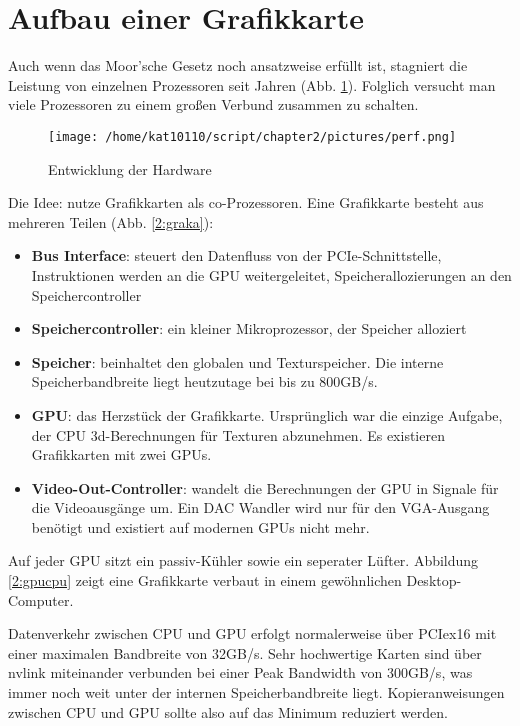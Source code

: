         \section{Aufbau einer Grafikkarte}
        Auch wenn das Moor'sche Gesetz noch ansatzweise erfüllt ist, stagniert die Leistung von einzelnen Prozessoren seit Jahren (Abb. \ref{2:hard}). Folglich versucht man viele Prozessoren zu einem großen Verbund zusammen zu schalten.
        \begin{figure}[h]
			\centering
    		\texttt{[image: /home/kat10110/script/chapter2/pictures/perf.png]}
    		\caption[Hardware]{Entwicklung der Hardware}
    		\label{2:hard}
		\end{figure}

		Die Idee: nutze Grafikkarten als co-Prozessoren. Eine Grafikkarte besteht aus mehreren Teilen (Abb. \ref{2:graka}):
		\begin{itemize}
			\item \textbf{Bus Interface}: steuert den Datenfluss von der \Gls{PCIe}-Schnittstelle, Instruktionen werden an die GPU weitergeleitet, Speicherallozierungen an den Speichercontroller
			\item \textbf{Speichercontroller}: ein kleiner Mikroprozessor, der Speicher alloziert
			\item \textbf{Speicher}: beinhaltet den globalen und Texturspeicher. Die interne Speicherbandbreite liegt heutzutage bei bis zu 800GB/s.
			\item \textbf{GPU}: das Herzstück der Grafikkarte. Ursprünglich war die einzige Aufgabe, der CPU 3d-Berechnungen für Texturen abzunehmen. Es existieren Grafikkarten mit zwei GPUs.
			\item \textbf{Video-Out-Controller}: wandelt die Berechnungen der GPU in Signale für die Videoausgänge um. Ein DAC Wandler wird nur für den VGA-Ausgang benötigt und existiert auf modernen GPUs nicht mehr. 			
		\end{itemize}
		Auf jeder GPU sitzt ein passiv-Kühler sowie ein seperater Lüfter. Abbildung \ref{2:gpucpu} zeigt eine Grafikkarte verbaut in einem gewöhnlichen Desktop-Computer. 
		
		Datenverkehr zwischen CPU und GPU erfolgt normalerweise über \Gls{PCIe}x16 mit einer maximalen Bandbreite von 32GB/s. Sehr hochwertige Karten sind über \gls{nvlink} miteinander verbunden bei einer \Gls{Peak Bandwidth} von 300GB/s, was immer noch weit unter der internen Speicherbandbreite liegt. Kopieranweisungen zwischen CPU und GPU sollte also auf das Minimum reduziert werden.
		
